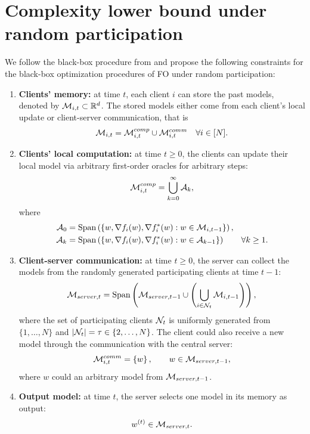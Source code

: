 \section{Complexity lower bound under random participation}
\label{sec:lowerBound}

We follow the black-box procedure from \cite{Scaman2017OptimalAF,Scaman2018OptimalAF} and propose the following constraints for the black-box optimization procedures of FO under random participation:
\begin{enumerate}
    \item \textbf{Clients' memory:} at time $t$, each client $i$ can store the past models, denoted by $\mathcal{M}_{i,t} \subset \mathbb{R}^d$. The stored models  either come from each client's local update or client-server communication, that is
    \[
        \mathcal{M}_{i,t} = \mathcal{M}_{i,t}^{comp} \cup \mathcal{M}_{i,t}^{comm} \quad \forall i \in [N].
    \]
    \item \textbf{Clients' local computation:} at time $t \geq 0$, the clients can update their local model via arbitrary first-order oracles for arbitrary steps:
    \[
        \mathcal{M}_{i,t}^{comp} = \bigcup_{k=0}^{\infty} \mathcal{A}_k,
    \]
    where
    \begin{align*}
        \mathcal{A}_0 &= \mathrm{Span}\left( \left\{  w, \nabla f_i(w), \nabla f_i^*(w) : w \in \mathcal{M}_{i,t-1}  \right\} \right), \\
        \mathcal{A}_k &= \mathrm{Span}\left( \left\{  w, \nabla f_i(w), \nabla f_i^*(w) : w \in \mathcal{A}_{k-1}  \right\} \right) \qquad \forall k \geq 1.
    \end{align*}
    \item \textbf{Client-server communication:} at time $t \geq 0$, the server can collect the models from the randomly generated participating clients at time $t-1$:
    \[
        \displaystyle \mathcal{M}_{server, t} = \mathrm{Span} \left( \mathcal{M}_{server, t-1} \cup  \left( \bigcup_{i \in \mathcal{N}_t} \mathcal{M}_{i, t-1} \right) \right),
    \]
    where the set of participating clients $\mathcal{N}_t$ is uniformly generated from $\{1, \dots, N\}$ and $|\mathcal{N}_t| = \tau \in \{2, \dots, N\}$. The client could also receive a new model through the communication with the central server:
    \[
        \mathcal{M}_{i,t}^{comm} = \left\{ w \right\}, \qquad w \in \mathcal{M}_{server, t-1},
    \]
    where $w$ could an arbitrary model from $\mathcal{M}_{server, t-1}$.
    \item \textbf{Output model:} at time $t$, the server selects one model in its memory as output:
    \[
        w^{(t)} \in \mathcal{M}_{server, t}.
    \]
\end{enumerate}

